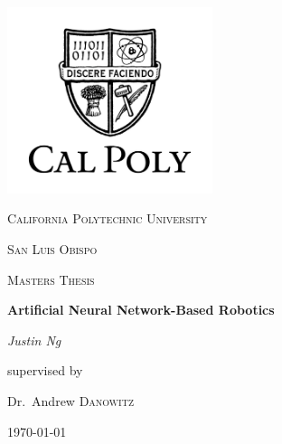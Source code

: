\documentclass[12pt,a4paper]{report}
\begin{document}
\begin{titlepage}
	\centering
	\includegraphics[width=0.45\textwidth]{images/cal_poly_shield.png}\par\vspace{1cm}
	{\scshape\LARGE California Polytechnic University \par}
	\vspace{0.25cm}
	{\scshape\LARGE San Luis Obispo \par}
	\vspace{1cm}
	{\scshape\Large Masters Thesis\par}
	\vspace{1.5cm}
	{\huge\bfseries Artificial Neural Network-Based Robotics\par}
	\vspace{2cm}
	{\Large\itshape Justin Ng\par}
	\vfill
	supervised by\par
	Dr.~Andrew \textsc{Danowitz}

	\vfill

	{\large \today\par}
\end{titlepage}
\end{document}
